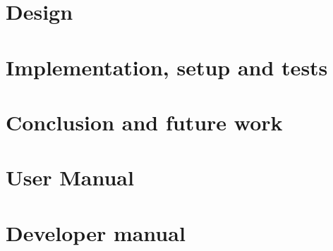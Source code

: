 \documentclass[pdfa%
,twoside%
,12pt%
]{toptesi}
\begin{document}
\chapter{Design}
\label{chap:3}


\chapter{Implementation, setup and tests}
\label{chap:4}

\chapter{Conclusion and future work}
\label{chap:5}


\appendix

\chapter{User Manual}

\chapter{Developer manual}


%



\end{document}
